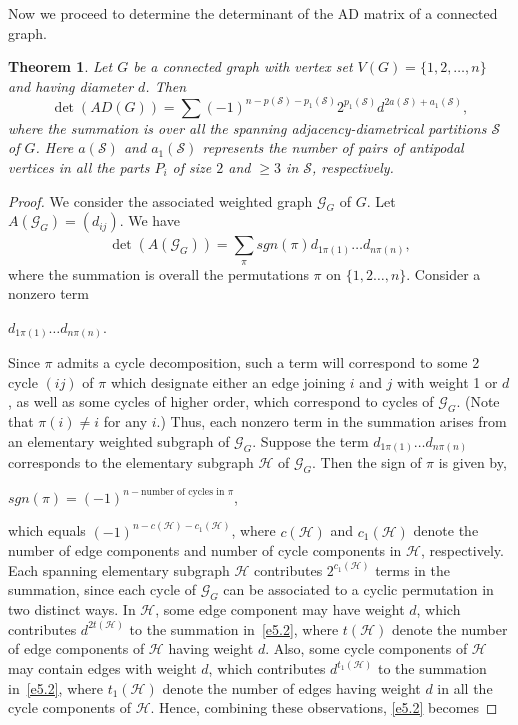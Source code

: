 \documentclass[12pt]{article}
\numberwithin{equation}{section}
\newtheorem{thm}{Theorem}[section]
\begin{document}
		Now we proceed to determine the determinant of the AD matrix of a connected graph.
	\begin{thm}\label{thm 5.1}
		Let $G$ be a connected graph with vertex set $V(G)=\{1,2,\dots,n\}$ and having diameter $d$. Then
		\begin{equation}\label{e5.1}
			\det (AD(G)) = \sum (-1)^{n-p(\mathcal S)-p_1(\mathcal S)} 2^{p_{1}(\mathcal S)} d^{2 a(\mathcal S)+a_{1}(\mathcal S)},
		\end{equation}
		where the summation is over all the spanning adjacency-diametrical partitions $\mathcal S$ of $G$. Here $a(\mathcal S)$ and $a_{1}(\mathcal S)$ represents the number of pairs of antipodal vertices in all the parts $P_i$ of size $2$ and $\ge 3$ in $\mathcal S$, respectively.
	\end{thm}
	\begin{proof}
		We consider the associated weighted graph $\mathcal{G}_G$ of $G$. Let $A(\mathcal{G}_G)=(d_{ij})$. We have
		\begin{equation}\label{e5.2}
			\det (A(\mathcal{G}_G))=\overset{}{\underset{\pi}{\sum}} sgn(\pi) d_{1\pi(1)}\dots d_{n\pi(n)},
		\end{equation}
		where the summation is overall the permutations $\pi$ on $\{1, 2\dots,n\}$. Consider a nonzero term
		\begin{center}
			$d_{1\pi(1)}\dots d_{n\pi(n)}$.
		\end{center}
		Since $\pi$ admits a cycle decomposition, such a term will correspond to some 2 cycle $(ij)$ of $\pi$ which designate either an edge joining $i$ and $j$ with weight 1 or $d$, as well as some cycles of higher order, which correspond to cycles of $\mathcal{G}_G$. (Note that $\pi(i)\neq i$ for any $i$.) Thus, each nonzero term in the summation arises from an elementary weighted subgraph of $\mathcal{G}_G$. Suppose the term $d_{1\pi(1)}\dots d_{n\pi(n)}$ corresponds to the elementary subgraph $\mathcal{H}$ of $\mathcal{G}_G$. Then the sign of $\pi$ is given by,
		\begin{center}
			$sgn(\pi)=(-1)^{n-\text{number of cycles in }\pi}$,
		\end{center} 
		which equals $(-1)^{n-c(\mathcal{H})-c_1(\mathcal{H})}$, where $c(\mathcal{H})$ and $c_1(\mathcal{H})$ denote the number of edge components and number of cycle components in $\mathcal{H}$, respectively. Each spanning elementary subgraph $\mathcal{H}$  contributes $2^{c_{1}(\mathcal{H})}$ terms in the summation, since each  cycle of $\mathcal{G}_G$ can be associated to a cyclic permutation in two distinct ways. In $\mathcal{H}$, some edge component may have weight $d$, which contributes $d^{2t(\mathcal{H})}$ to the summation in~\eqref{e5.2}, where $t(\mathcal{H})$ denote the number of edge components of $\mathcal{H}$ having weight $d$. Also, some cycle components of $\mathcal{H}$ may contain edges with weight $d$, which contributes $d^{t_{1}(\mathcal{H})}$ to the summation in~\eqref{e5.2}, where $t_{1}(\mathcal{H})$ denote the number of edges having weight $d$ in all the  cycle components of $\mathcal{H}$. Hence, combining these observations, \eqref{e5.2} becomes
		

\end{proof}
\end{document}
